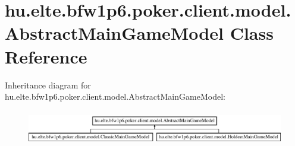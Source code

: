 \hypertarget{classhu_1_1elte_1_1bfw1p6_1_1poker_1_1client_1_1model_1_1_abstract_main_game_model}{}\section{hu.\+elte.\+bfw1p6.\+poker.\+client.\+model.\+Abstract\+Main\+Game\+Model Class Reference}
\label{classhu_1_1elte_1_1bfw1p6_1_1poker_1_1client_1_1model_1_1_abstract_main_game_model}
Inheritance diagram for hu.\+elte.\+bfw1p6.\+poker.\+client.\+model.\+Abstract\+Main\+Game\+Model\+:\begin{figure}[H]
\begin{center}
\leavevmode
\includegraphics[height=1.573034cm]{classhu_1_1elte_1_1bfw1p6_1_1poker_1_1client_1_1model_1_1_abstract_main_game_model}
\end{center}
\end{figure}
